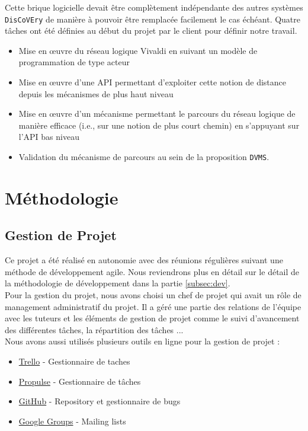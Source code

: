\documentclass[11pt,a4paper]{article}
\begin{document}
Cette brique logicielle devait être complètement indépendante des autres systèmes \texttt{DisCoVEry} de manière à pouvoir être remplacée facilement le cas échéant. Quatre tâches ont été définies au début du projet par le client pour définir notre travail.

\begin{itemize}
\item Mise en \oe uvre du réseau logique Vivaldi en suivant un modèle de programmation de type acteur
\item Mise en \oe uvre d'une API permettant d'exploiter cette notion de distance depuis les mécanismes de plus haut niveau
\item Mise en \oe uvre d'un mécanisme permettant le parcours du réseau logique de manière efficace (i.e., sur une notion de plus court chemin) en s'appuyant sur l'API bas niveau
\item Validation du mécanisme de parcours au sein de la proposition \texttt{DVMS}.
\end{itemize}

\section{Méthodologie}
\subsection{Gestion de Projet}
Ce projet a été réalisé en autonomie avec des réunions régulières suivant une méthode de développement agile. Nous reviendrons plus en détail sur le détail de la méthodologie de développement dans la partie \ref{subsec:dev}.\\

Pour la gestion du projet, nous avons choisi un chef de projet qui avait un rôle de management administratif du projet. Il a géré une partie des relations de l'équipe avec les tuteurs et les éléments de gestion de projet comme le suivi d'avancement des différentes tâches, la répartition des tâches ...\\

Nous avons aussi utilisés plusieurs outils en ligne pour la gestion de projet :
\begin{itemize}
\item \href{https://www.trello.com}{Trello} - Gestionnaire de taches
\item \href{http://ppulse.fr}{Propulse} - Gestionnaire de tâches
\item \href{http://www.github.com}{GitHub} - Repository et gestionnaire de bugs
\item \href{https://groups.google.com}{Google Groups} - Mailing lists
\end{itemize}
\end{document}
